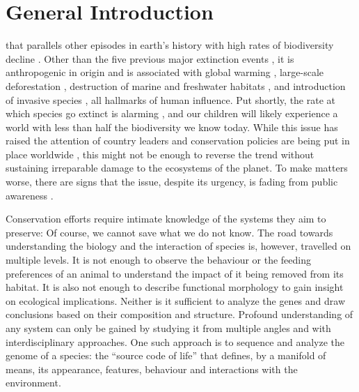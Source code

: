 \chapter{General Introduction}
\label{introduction}

 that parallels
other episodes in earth's history with high rates of biodiversity
decline \citep{Pimm1995, Dirzo2003, Schipper2008, Barnosky2011,
Dirzo2014}. Other than the five previous major extinction events
\citep{Kolbert2014}, it is anthropogenic in origin \citep{Leakey1996,
Ceballos2015} and is associated with global warming \citep{Cook2016,
Wuebbles2017}, large-scale deforestation \citep{Wright2005}, destruction
of marine and freshwater habitats \citep{Burkhead2012}, and introduction
of invasive species \citep{Mooney2001}, all hallmarks of human
influence. Put shortly, the rate at which species go extinct is alarming
\citep{Newbold2016, Ceballos2017, Hallmann2017}, and our children will
likely experience a world with less than half the biodiversity we know
today. While this issue has raised the attention of country leaders and
conservation policies are being put in place worldwide
\citep{Puntaru2017}, this might not be enough to reverse the trend
without sustaining irreparable damage to the ecosystems of the planet.
To make matters worse, there are signs that the issue, despite its
urgency, is fading from public awareness \citep{Kusmanoff2017}. 

Conservation efforts require intimate knowledge of the systems they aim
to preserve: Of course, we cannot save what we do not know. The road
towards understanding the biology and the interaction of species is,
however, travelled on multiple levels. It is not enough to observe the
behaviour or the feeding preferences of an animal to understand the
impact of it being removed from its habitat. It is also not enough to
describe functional morphology to gain insight on ecological
implications. Neither is it sufficient to analyze the genes and draw
conclusions based on their composition and structure. Profound
understanding of any system can only be gained by studying it from
multiple angles and with interdisciplinary approaches. One such approach
is to sequence and analyze the genome of a species: the ``source code of
life'' that defines, by a manifold of means, its appearance, features,
behaviour and interactions with the environment.

